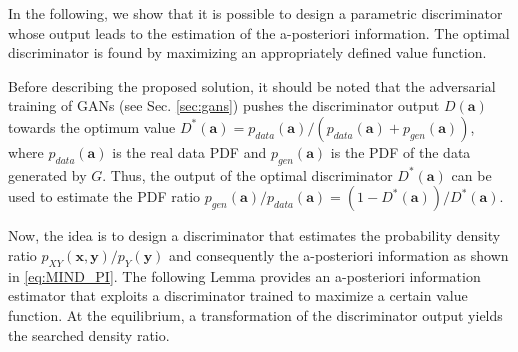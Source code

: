 In the following, we show that it is possible to design a parametric discriminator whose output leads to the estimation of the a-posteriori information. The optimal discriminator is found by maximizing an appropriately defined value function.

Before describing the proposed solution, it should be noted that the adversarial training of GANs (see Sec. \ref{sec:gans}) pushes the discriminator output $D(\mathbf{a})$ towards the optimum value $D^*(\mathbf{a}) = p_{data}(\mathbf{a})/(p_{data}(\mathbf{a})+p_{gen}(\mathbf{a}))$, 
where $p_{data}(\mathbf{a})$ is the real data PDF and $p_{gen}(\mathbf{a})$ is the PDF of the data generated by $G$.
Thus, the output of the optimal discriminator $D^*(\mathbf{a})$ can be used to estimate the PDF ratio 
$p_{gen}(\mathbf{a})/p_{data}(\mathbf{a}) = (1-D^*(\mathbf{a}))/D^*(\mathbf{a}).$
 
Now, the idea is to design a discriminator that estimates the probability density ratio $p_{XY}(\mathbf{x},\mathbf{y})/p_{Y}(\mathbf{y})$ and consequently the a-posteriori information as shown in \eqref{eq:MIND_PI}. 
The following Lemma provides an a-posteriori information estimator that exploits a discriminator trained to maximize a certain value function. At the equilibrium, a transformation of the discriminator output yields the searched density ratio. 

